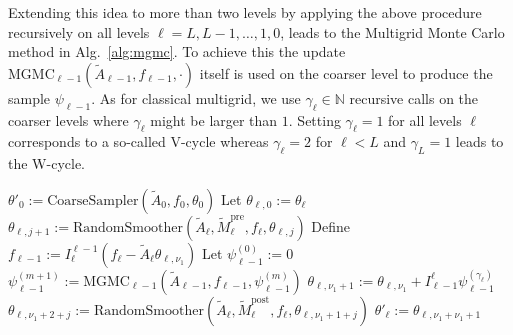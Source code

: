 \documentclass[11pt,english]{article}
\theoremstyle{plain}
\theoremstyle{plain}
\theoremstyle{plain}
\theoremstyle{plain}
\numberwithin{equation}{section}
\begin{document}
Extending this idea to more than two levels by applying the above procedure recursively on all levels $\ell=L,L-1,\dots,1,0$, leads to the Multigrid Monte Carlo method in Alg.~\ref{alg:mgmc}. To achieve this the update $\mathrm{MGMC}_{\ell-1}(\widetilde{A}_{\ell-1},f_{\ell-1},\cdot)$ itself is used on the coarser level to produce the sample $\psi_{\ell-1}$. As for classical multigrid, we use $\gamma_\ell\in\mathbb{N}$ recursive calls on the coarser levels where $\gamma_\ell$ might be larger than $1$. Setting $\gamma_\ell=1$ for all levels $\ell$ corresponds to a so-called V-cycle whereas $\gamma_\ell=2$ for $\ell<L$ and $\gamma_L=1$ leads to the W-cycle.
\begin{algorithm}[t!]
    \caption{Multigrid Monte Carlo update $\theta_\ell \mapsto\theta'_\ell$\\The random pre- and post-smoothers are defined by the splitting matrices $\widetilde{M}_\ell^{\mathrm{pre}}$, $\widetilde{M}_\ell^{\mathrm{post}}$ and the number of smoothing steps $\nu_1$, $\nu_2$; the cycle parameters $\gamma_\ell$ control the number of recursive calls}\label{alg:mgmc}
    \begin{algorithmic}[1]
        \State\Return $\theta'_{0}:=\mathrm{CoarseSampler}(\widetilde{A}_{0},f_{0},\theta_{0})$
        \Else
        \State  Let $\theta_{\ell,0}:=\theta_{\ell}$
        \State $\theta_{\ell,j+1}:=\mathrm{RandomSmoother}(\widetilde{A}_{\ell},\widetilde{M}_{\ell}^{\mathrm{pre}},f_{\ell},\theta_{\ell,j})$
        \EndFor
        \State Define $f_{\ell-1}:=I_{\ell}^{\ell-1}(f_{\ell}-\widetilde{A}_{\ell}\theta_{\ell,\nu_{1}})$
        \State Let $\psi_{\ell-1}^{(0)}:=0$
        \State $\psi_{\ell-1}^{(m+1)}:=\mathrm{MGMC}_{\ell-1}(\widetilde{A}_{\ell-1},f_{\ell-1},\psi_{\ell-1}^{(m)})$
        \EndFor
        \State $\theta_{\ell,\nu_{1}+1}:=\theta_{\ell,\nu_{1}}+I_{\ell-1}^{\ell}\psi_{\ell-1}^{(\gamma_\ell)}$
        \State $\theta_{\ell,\nu_{1}+2+j}:=\mathrm{RandomSmoother}(\widetilde{A}_{\ell},\widetilde{M}_{\ell}^{\mathrm{post}},f_{\ell},\theta_{\ell,\nu_{1}+1+j})$
        \EndFor
        \State \Return $\theta'_{\ell}:=\theta_{\ell,\nu_{1}+\nu_{1}+1}$
        \EndIf
        \EndProcedure
    \end{algorithmic}
\end{algorithm}
\end{document}
